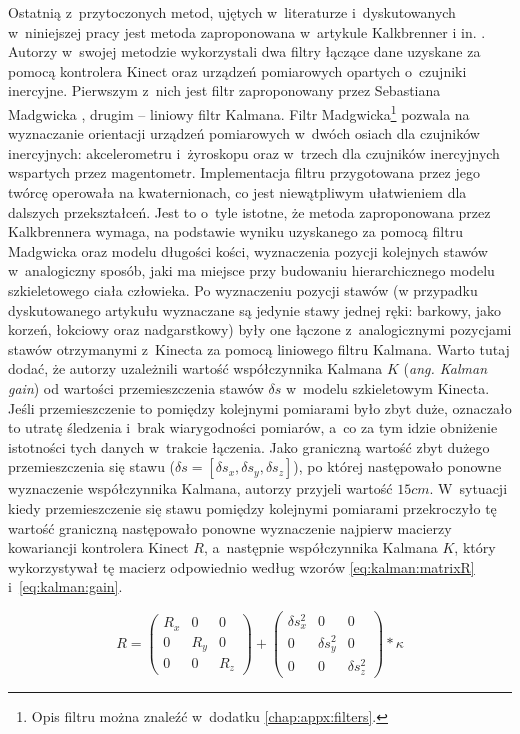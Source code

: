 Ostatnią z~przytoczonych metod, ujętych w~literaturze i~dyskutowanych w~niniejszej pracy jest metoda zaproponowana w~artykule Kalkbrenner i in. \cite{Kalkbrenner2014}. Autorzy w~swojej metodzie wykorzystali dwa filtry łączące dane uzyskane za pomocą kontrolera Kinect oraz urządzeń pomiarowych opartych o~czujniki inercyjne. Pierwszym z~nich jest filtr zaproponowany przez Sebastiana Madgwicka \cite{Kalkbrenner2014}, drugim -- liniowy filtr Kalmana. Filtr Madgwicka\footnote{Opis filtru można znaleźć w~dodatku \ref{chap:appx:filters}.} pozwala na wyznaczanie orientacji urządzeń pomiarowych w~dwóch osiach dla czujników inercyjnych: akcelerometru i~żyroskopu oraz w~trzech dla czujników inercyjnych wspartych przez magentometr. Implementacja filtru przygotowana przez jego twórcę operowała na kwaternionach, co jest niewątpliwym ułatwieniem dla dalszych przekształceń. Jest to o~tyle istotne, że metoda zaproponowana przez Kalkbrennera wymaga, na podstawie wyniku uzyskanego za pomocą filtru Madgwicka oraz modelu długości kości, wyznaczenia pozycji kolejnych stawów  w~analogiczny sposób, jaki ma miejsce przy budowaniu hierarchicznego modelu szkieletowego ciała człowieka. Po wyznaczeniu pozycji stawów (w przypadku dyskutowanego artykułu wyznaczane są jedynie stawy jednej ręki: barkowy, jako korzeń, łokciowy oraz nadgarstkowy) były one łączone z~analogicznymi pozycjami stawów otrzymanymi z~Kinecta za pomocą liniowego filtru Kalmana.																																																			
Warto tutaj dodać, że autorzy uzależnili wartość współczynnika Kalmana $K$ (\emph{ang. Kalman gain}) od wartości przemieszczenia stawów $\delta s$ w~modelu szkieletowym Kinecta. Jeśli przemieszczenie to pomiędzy kolejnymi pomiarami było zbyt duże, oznaczało to utratę śledzenia i~brak wiarygodności pomiarów, a~co za tym idzie obniżenie istotności tych danych w~trakcie łączenia. Jako graniczną wartość zbyt dużego przemieszczenia się stawu ($\delta s = [\delta s_x, \delta s_y, \delta s_z]$), po której następowało ponowne wyznaczenie współczynnika Kalmana, autorzy przyjeli wartość $15cm$. W~sytuacji kiedy przemieszczenie się stawu pomiędzy kolejnymi pomiarami przekroczyło tę wartość graniczną następowało ponowne wyznaczenie najpierw macierzy kowariancji kontrolera Kinect $R$, a~następnie współczynnika Kalmana $K$, który wykorzystywał tę macierz odpowiednio według wzorów \ref{eq:kalman:matrixR} i~\ref{eq:kalman:gain}.
																																																	
\begin{equation}
	R = 
	\begin{pmatrix}
		R_x & 0   & 0   \\
		0   & R_y & 0   \\
		0   & 0   & R_z 
	\end{pmatrix} +
	\begin{pmatrix}
		\delta s_x^2 & 0            & 0            \\
		0            & \delta s_y^2 & 0            \\
		0            & 0            & \delta s_z^2 
	\end{pmatrix} * \kappa
	\label{eq:kalman:matrixR}
\end{equation}
																																																			

